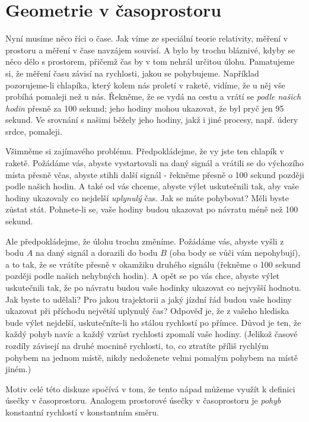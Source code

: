 {  \section{Geometrie v časoprostoru}\label{fyz:IIchapXLIIsecIV}
    Nyní musíme něco říci o čase. Jak víme ze speciální teorie relativity, měření v prostoru a 
    měření v čase navzájem souvisí. A bylo by trochu bláznivé, kdyby se něco dělo s prostorem, 
    přičemž čas by v tom nehrál určitou úlohu. Pamatujeme si, že měření času závisí na rychlosti, 
    jakou se pohybujeme. Například pozorujeme-li chlapíka, který kolem nás proletí v raketě, 
    vidíme, že u něj vše probíhá pomaleji než u nás. Řekněme, že se vydá na cestu a vrátí se 
    \emph{podle našich hodin} přesně za \num{100} sekund; jeho hodiny mohou ukazovat, že byl pryč 
    jen \num{95} sekund. Ve srovnání s našimi běžely jeho hodiny, jakž i jiné procesy, např. údery 
    srdce, pomaleji.
    
    Všimněme si zajímavého problému. Předpokládejme, že vy jste ten chlapík v raketě. Požádáme vás, 
    abyste vystartovali na daný signál a vrátili se do výchozího místa přesně včas, abyste stihli 
    další signál - řekněme přesně o 100 sekund později podle našich hodin. A také od vás chceme, 
    abyste výlet uskutečnili tak, aby vaše hodiny ukazovaly co nejdelší \emph{uplynulý} čas. Jak se 
    máte pohybovat? Měli byste zůstat stát. Pohnete-li se, vaše hodiny budou ukazovat po návratu 
    méně než \num{100} sekund. 
    
    Ale předpokládejme, že úlohu trochu změníme. Požádáme vás, abyste vyšli z bodu \(A\) na daný 
    signál a dorazili do bodu \(B\) (oba body se vůči vám nepohybují), a to tak, že se vrátíte 
    přesně v okamžiku druhého signálu (řekněme o \num{100} sekund později podle našich nehybných 
    hodin). A opět se po vás chce, abyste výlet uskutečnili tak, že po návratu budou vaše hodinky 
    ukazovat co nejvyšší hodnotu. Jak byste to udělali? Pro jakou trajektorii a jaký jízdní řád 
    budou vaše hodiny ukazovat při příchodu největší uplynulý čas? Odpověď je, že z vašeho hlediska 
    bude výlet nejdelší, uskutečníte-li ho stálou rychlostí po přímce. Důvod je ten, že každý pohyb 
    navíc a každý vzrůst rychlosti zpomalí vaše hodiny. (Jelikož časové rozdíly závisejí na druhé 
    mocnině rychlosti, to, co ztratíte příliš rychlým pohybem na jednom místě, nikdy nedoženete 
    velmi pomalým pohybem na místě jiném.)
     
    Motiv celé této diskuze spočívá v tom, že tento nápad můžeme využít k definici úsečky v 
    časoprostoru. Analogem prostorové úsečky v časoprostoru je \emph{pohyb} konstantní rychlostí v 
    konstantním směru. 
    
}
